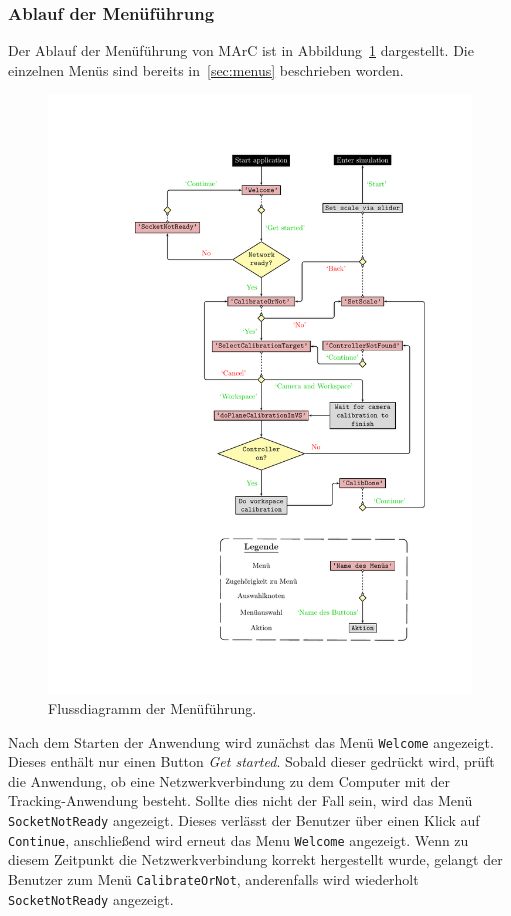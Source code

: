 \subsubsection{Ablauf der Menüführung}\label{sec:menuAblauf}
Der Ablauf der Menüführung von MArC ist in Abbildung~\ref{fig:menuFlow} dargestellt. Die einzelnen Menüs sind bereits in~\ref{sec:menus} beschrieben worden.

\begin{figure}[htbp]
	\centering
	\includegraphics[scale=.9, trim=5.5cm 2.5cm 3.5cm 2.5cm]{kapitel/system/MP_Menu_Flowchart.pdf}
	\caption{Flussdiagramm der Menüführung.}
	\label{fig:menuFlow}
\end{figure}

Nach dem Starten der Anwendung wird zunächst das Menü \texttt{Welcome} angezeigt. Dieses enthält nur einen Button \textit{Get started}. Sobald dieser gedrückt wird, prüft die Anwendung, ob eine Netzwerkverbindung zu dem Computer mit der Tracking-Anwendung besteht. Sollte dies nicht der Fall sein, wird das Menü \texttt{Socket\-Not\-Ready} angezeigt. Dieses verlässt der Benutzer über einen Klick auf \texttt{Continue}, anschließend wird erneut das Menu \texttt{Welcome} angezeigt. Wenn zu diesem Zeitpunkt die Netzwerkverbindung korrekt hergestellt wurde, gelangt der Benutzer zum Menü \texttt{Calibrate\-Or\-Not}, anderenfalls wird wiederholt \texttt{Socket\-Not\-Ready} angezeigt.

